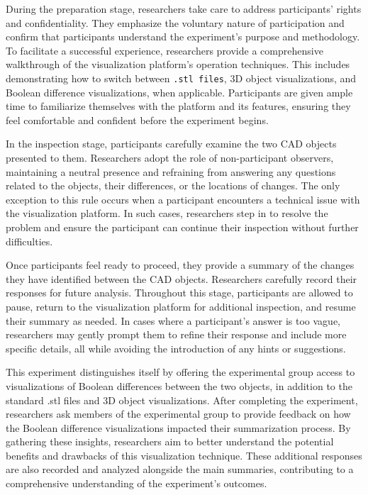 \documentclass[sigconf,authorversion,nonacm]{acmart}
\begin{document}
During the preparation stage, researchers take care to address participants' rights and confidentiality. They emphasize the voluntary nature of participation and confirm that participants understand the experiment's purpose and methodology. 
To facilitate a successful experience, researchers provide a comprehensive walkthrough of the visualization platform's operation techniques. This includes demonstrating how to switch between \texttt{.stl files}, 3D object visualizations, and Boolean difference visualizations, when applicable. 
Participants are given ample time to familiarize themselves with the platform and its features, ensuring they feel comfortable and confident before the experiment begins.

In the inspection stage, participants carefully examine the two CAD objects presented to them. Researchers adopt the role of non-participant observers, maintaining a neutral presence and refraining from answering any questions related to the objects, their differences, or the locations of changes. 
The only exception to this rule occurs when a participant encounters a technical issue with the visualization platform. 
In such cases, researchers step in to resolve the problem and ensure the participant can continue their inspection without further difficulties.

Once participants feel ready to proceed, they provide a summary of the changes they have identified between the CAD objects. Researchers carefully record their responses for future analysis. 
Throughout this stage, participants are allowed to pause, return to the visualization platform for additional inspection, and resume their summary as needed. In cases where a participant's answer is too vague, 
researchers may gently prompt them to refine their response and include more specific details, all while avoiding the introduction of any hints or suggestions.

This experiment distinguishes itself by offering the experimental group access to visualizations of Boolean differences between the two objects, in addition to the standard .stl files and 3D object visualizations. 
After completing the experiment, researchers ask members of the experimental group to provide feedback on how the Boolean difference visualizations impacted their summarization process. 
By gathering these insights, researchers aim to better understand the potential benefits and drawbacks of this visualization technique. 
These additional responses are also recorded and analyzed alongside the main summaries, contributing to a comprehensive understanding of the experiment's outcomes.
\end{document}
